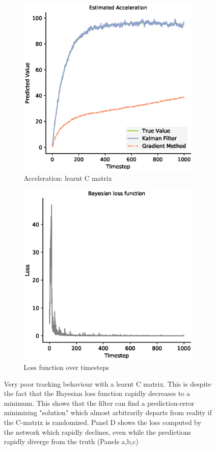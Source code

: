 \begin{figure}
\begin{subfigure}{0.33\textwidth}
 \centering
 \includegraphics[width=.8\linewidth]{chapter_3_figures/Estimated_Acceleration_C_matrix.eps}
 \caption{Acceleration: learnt C matrix}
 \end{subfigure}
 \medskip

 \begin{subfigure}{0.5\textwidth}
 \centering
 \includegraphics[width=.8\linewidth]{chapter_3_figures/NKF_C_matrix_loss.eps}
 \caption{Loss function over timesteps}
 \end{subfigure}
 
 \caption{Very poor tracking behaviour with a learnt C matrix. This is despite the fact that the Bayesian loss function rapidly decreases to a minimum. This shows that the filter can find a prediction-error minimizing "solution" which almost arbitrarily departs from reality if the C-matrix is randomized. Panel D shows the loss computed by the network which rapidly declines, even while the predictions rapidly diverge from the truth (Panels a,b,c)}
 
\label{KF_learn_C_figure}
\end{figure}

